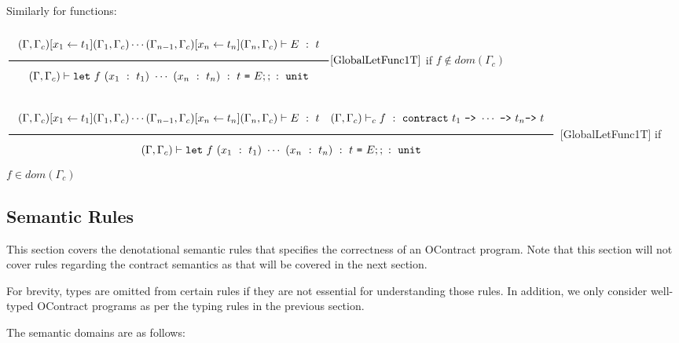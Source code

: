 \documentclass[a4paper]{article}
\newcommand{\Rule}[2]{\genfrac{}{}{0.7pt}{}{{\setlength{\fboxrule}{0pt}\setlength{\fboxsep}{3mm}\fbox{$#1$}}}{{\setlength{\fboxrule}{0pt}\setlength{\fboxsep}{3mm}\fbox{$#2$}}}}
\newcommand{\RuleWithName}[3]{\genfrac{}{}{0.7pt}{}{{\setlength{\fboxrule}{0pt}\setlength{\fboxsep}{3mm}\fbox{$#1$}}}{{\setlength{\fboxrule}{0pt}\setlength{\fboxsep}{3mm}\fbox{$#2$}}}[\text{#3}]}
\begin{document}
Similarly for functions:

\begin{center}
    $\RuleWithName{(\Gamma, \Gamma_c) [x_1 \leftarrow t_1] (\Gamma_1, \Gamma_c) \cdots (\Gamma_{n-1}, \Gamma_c) [x_n \leftarrow t_n] (\Gamma_n, \Gamma_c) \vdash E\ :\ t}
        {(\Gamma, \Gamma_c) \vdash \texttt{let}\ f\ (x_1\ :\ t_1)\ \cdots\ (x_n\ :\ t_n)\ :\ t\ \texttt{=}\ E;;\ :\ \texttt{unit}}{GlobalLetFunc1T}$
        if $f \notin dom(\Gamma_c)$

    $\Rule{(\Gamma, \Gamma_c) [x_1 \leftarrow t_1] (\Gamma_1, \Gamma_c) \cdots (\Gamma_{n-1}, \Gamma_c) [x_n \leftarrow t_n] (\Gamma_n, \Gamma_c) \vdash E\ :\ t\quad (\Gamma,\Gamma_c) \vdash_c f\ :\ \texttt{contract}\ t_1\ \texttt{->}\ \cdots\ \texttt{->}\ t_n \texttt{->}\ t}
        {(\Gamma, \Gamma_c) \vdash \texttt{let}\ f\ (x_1\ :\ t_1)\ \cdots\ (x_n\ :\ t_n)\ :\ t\ \texttt{=}\ E;;\ :\ \texttt{unit}}$
        [GlobalLetFunc1T] if $f \in dom(\Gamma_c)$
\end{center}

\subsection{Semantic Rules}

This section covers the denotational semantic rules that specifies the correctness of an OContract program.
Note that this section will not cover rules regarding the contract semantics as that will be covered in the next section.

For brevity, types are omitted from certain rules if they are not essential for understanding those rules.
In addition, we only consider well-typed OContract programs as per the typing rules in the previous section.

The semantic domains are as follows:
\end{document}
